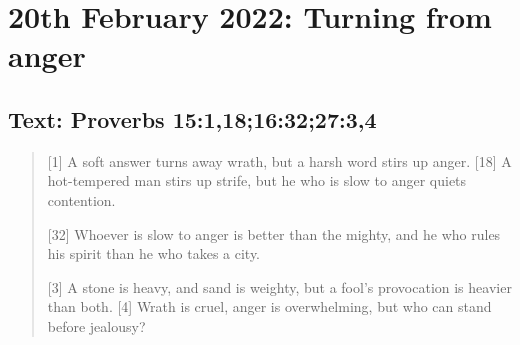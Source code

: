 \section{20th February 2022: Turning from anger}
\subsection*{Text: Proverbs 15:1,18;16:32;27:3,4}
  \begin{quote}
    [1] A soft answer turns away wrath,
        but a harsh word stirs up anger.
    [18] A hot-tempered man stirs up strife,
        but he who is slow to anger quiets contention.

    [32] Whoever is slow to anger is better than the mighty,
        and he who rules his spirit than he who takes a city.   

    [3] A stone is heavy, and sand is weighty,
        but a fool's provocation is heavier than both.
    [4] Wrath is cruel, anger is overwhelming,
        but who can stand before jealousy?
  \end{quote}
